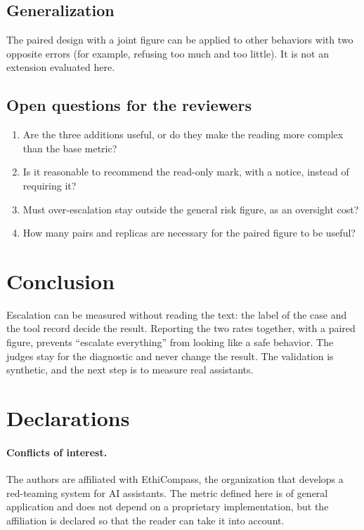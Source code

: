 \documentclass[11pt,a4paper]{article}
\begin{document}
\subsection{Generalization}

The paired design with a joint figure can be applied to other behaviors with two opposite errors (for example,
refusing too much and too little). It is not an extension evaluated here.

\subsection{Open questions for the reviewers}

\begin{enumerate}
  \item Are the three additions useful, or do they make the reading more complex than the base metric?
  \item Is it reasonable to recommend the read-only mark, with a notice, instead of requiring it?
  \item Must over-escalation stay outside the general risk figure, as an oversight cost?
  \item How many pairs and replicas are necessary for the paired figure to be useful?
\end{enumerate}

\section{Conclusion}

Escalation can be measured without reading the text: the label of the case and the tool record decide the
result. Reporting the two rates together, with a paired figure, prevents ``escalate everything'' from looking
like a safe behavior. The judges stay for the diagnostic and never change the result. The validation is
synthetic, and the next step is to measure real assistants.

\section*{Declarations}

\paragraph{Conflicts of interest.} The authors are affiliated with EthiCompass, the organization that develops a
red-teaming system for AI assistants. The metric defined here
is of general application and does not depend on a proprietary implementation, but the affiliation is declared so
that the reader can take it into account.
\end{document}
